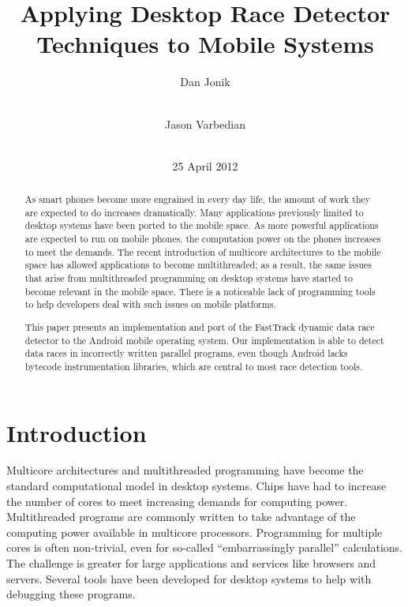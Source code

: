 \documentclass{acm_proc_article-sp}
\begin{document}
\title{Applying Desktop Race Detector Techniques to Mobile Systems}
\author{
\alignauthor Dan Jonik\\
\\
\and
\alignauthor Jason Varbedian\\
\\
}
\date{25 April 2012}
\maketitle

\begin{abstract}
As smart phones become more engrained in every day life, the amount of work they are expected to do increases dramatically. Many applications previously limited to desktop systems have been ported to the mobile space. As more powerful applications are expected to run on mobile phones, the computation power on the phones increases to meet the demands. The recent introduction of multicore architectures to the mobile space has allowed applications to become multithreaded; as a result, the same issues that arise from multithreaded programming on desktop systems have started to become relevant in the mobile space. There is a noticeable lack of programming tools to help developers deal with such issues on mobile platforms.
 
This paper presents an implementation and port of the FastTrack dynamic data race detector to the Android mobile operating system. Our implementation is able to detect data races in incorrectly written parallel programs, even though Android lacks bytecode instrumentation libraries, which are central to most race detection tools.
\end{abstract}

\section{Introduction}
Multicore architectures and multithreaded programming have become the standard computational model in desktop systems. Chips have had to increase the number of cores to meet increasing demands for computing power. Multithreaded programs are commonly written to take advantage of the computing power available in multicore processors. Programming for multiple cores is often non-trivial, even for so-called ``embarrassingly parallel'' calculations. The challenge is greater for large applications and services like browsers and servers. Several tools have been developed for desktop systems to help with debugging these programs.
 
\end{document}
